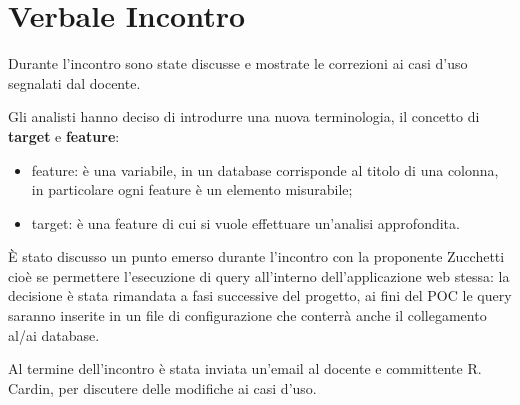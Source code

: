 \section{Verbale Incontro}
    Durante l'incontro sono state discusse e mostrate le correzioni ai casi d'uso segnalati dal docente.

    \noindent Gli analisti hanno deciso di introdurre una nuova terminologia, il concetto di \textbf{target} e \textbf{feature}:
    \begin{itemize}
        \item feature: è una variabile, in un database corrisponde al titolo di una colonna, in particolare ogni feature è un elemento misurabile;
        \item target: è una feature di cui si vuole effettuare un'analisi approfondita.
    \end{itemize}

    \noindent È stato discusso un punto emerso durante l'incontro con la proponente Zucchetti cioè se permettere l'esecuzione di query all'interno dell'applicazione web stessa: la decisione è stata rimandata a fasi successive del progetto, ai fini del POC le query saranno inserite in un file di configurazione che conterrà anche il collegamento al/ai database.

    \noindent Al termine dell'incontro è stata inviata un'email al docente e committente R. Cardin, per discutere delle modifiche ai casi d'uso.

    

